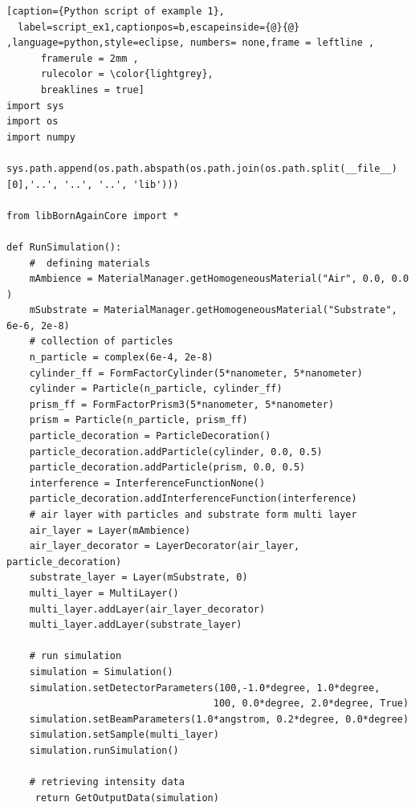 \newpage
\begin{lstlisting}[caption={Python script of example 1},
  label=script_ex1,captionpos=b,escapeinside={@}{@} ,language=python,style=eclipse, numbers= none,frame = leftline ,
      framerule = 2mm ,
      rulecolor = \color{lightgrey},
      breaklines = true]
import sys
import os
import numpy 

sys.path.append(os.path.abspath(os.path.join(os.path.split(__file__)[0],'..', '..', '..', 'lib')))

from libBornAgainCore import * 

def RunSimulation():
    #  defining materials 
    mAmbience = MaterialManager.getHomogeneousMaterial("Air", 0.0, 0.0 ) 
    mSubstrate = MaterialManager.getHomogeneousMaterial("Substrate", 6e-6, 2e-8) 
    # collection of particles 
    n_particle = complex(6e-4, 2e-8) 
    cylinder_ff = FormFactorCylinder(5*nanometer, 5*nanometer) 
    cylinder = Particle(n_particle, cylinder_ff) 
    prism_ff = FormFactorPrism3(5*nanometer, 5*nanometer) 
    prism = Particle(n_particle, prism_ff) 
    particle_decoration = ParticleDecoration()  
    particle_decoration.addParticle(cylinder, 0.0, 0.5)  
    particle_decoration.addParticle(prism, 0.0, 0.5)  
    interference = InterferenceFunctionNone()  
    particle_decoration.addInterferenceFunction(interference)  
    # air layer with particles and substrate form multi layer 
    air_layer = Layer(mAmbience)  
    air_layer_decorator = LayerDecorator(air_layer, particle_decoration) 
    substrate_layer = Layer(mSubstrate, 0) 
    multi_layer = MultiLayer()  
    multi_layer.addLayer(air_layer_decorator) 
    multi_layer.addLayer(substrate_layer) 

    # run simulation  
    simulation = Simulation()  
    simulation.setDetectorParameters(100,-1.0*degree, 1.0*degree, 
                                    100, 0.0*degree, 2.0*degree, True) 
    simulation.setBeamParameters(1.0*angstrom, 0.2*degree, 0.0*degree) 
    simulation.setSample(multi_layer) 
    simulation.runSimulation()  

    # retrieving intensity data
     return GetOutputData(simulation)
\end{lstlisting}



